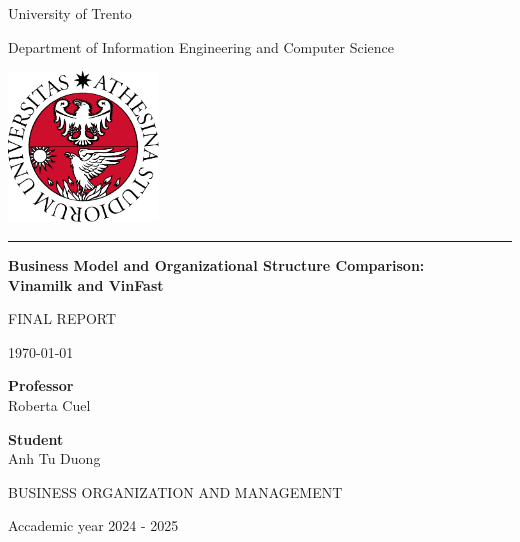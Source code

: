 \begin{titlepage}
    \centering %
    
    {\large University of Trento}\\
    {\large Department of Information Engineering and Computer Science \par}
    \vspace*{1cm}
    \includegraphics[width=0.3\textwidth]{figures/unitn-logo-color.png}\\
    \vspace*{1cm}
    \hrule
    \vspace*{1.2cm}
    
    {\huge\bfseries Business Model and Organizational Structure Comparison: \\ Vinamilk and VinFast \par}
    \vspace{1.2cm}

    {\large FINAL REPORT \par}
    {\normalsize \today \par}
    \vspace{3cm} 

    \begin{minipage}[t]{0.45\textwidth}
    {\bfseries Professor}\\
    {\Large Roberta Cuel}
    \end{minipage}
    \hfill
    \begin{minipage}[t]{0.28\textwidth}
    {\bfseries Student}\\
    {\Large Anh Tu Duong}
    \end{minipage}
    
    \vfill 
    
    {\Large BUSINESS ORGANIZATION AND MANAGEMENT \par}
    \vspace{0.4cm}
    {\large Accademic year 2024 - 2025 \par}

\end{titlepage}
